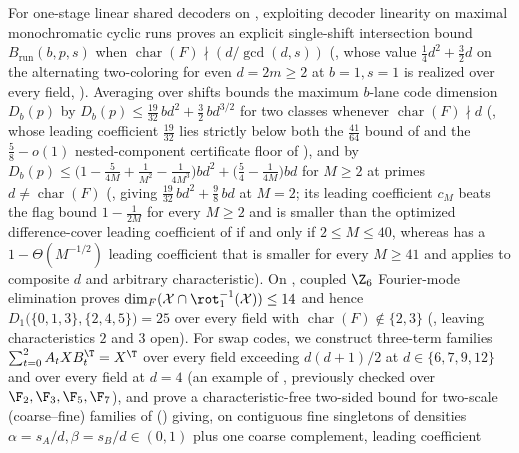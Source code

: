 For one-stage linear shared decoders on \cite[Problem~9.1(a)]{SeventeenthPaper2026}, exploiting
decoder linearity on maximal monochromatic
cyclic runs proves an explicit single-shift intersection bound $B_{\mathrm{run}}(b,p,s)$ when
$\operatorname{char}(F) \nmid (d/\gcd(d,s))$ (, whose value
$\frac{1}{4}d^2 + \frac{3}{2}d$ on the alternating two-coloring for even $d = 2m \ge 2$ at
$b = 1, s = 1$ is realized over every field, ). Averaging over shifts bounds
the maximum $b$-lane code dimension $D_b(p)$ by
$D_b(p) \le \frac{19}{32}\,bd^2 + \frac{3}{2}\,bd^{3/2}$ for two classes whenever
$\operatorname{char}(F) \nmid d$ (, whose leading coefficient $\frac{19}{32}$
lies strictly below both the $\frac{41}{64}$ bound of \cite[Theorem~3.4]{SharedDecoders2026} and the
$\frac{5}{8} - o(1)$ nested-component certificate floor of \cite[Theorem~C.6]{SharedDecoders2026}),
and by
$D_b(p) \le \bigl(1 - \frac{5}{4M} + \frac{1}{M^2} - \frac{1}{4M^3}\bigr)bd^2 +
\bigl(\frac{5}{4} - \frac{1}{4M}\bigr)bd$ for $M \ge 2$ at primes $d \ne \operatorname{char}(F)$
(, giving $\frac{19}{32}\,bd^2 + \frac{9}{8}\,bd$ at $M = 2$; its leading
coefficient $c_M$ beats the flag bound $1 - \frac{1}{2M}$ for every $M \ge 2$ and is smaller than the
optimized difference-cover leading coefficient of \cite[Theorem~3.5]{SharedDecoders2026} if and only
if $2 \le M \le 40$, whereas \cite[Theorem~3.5]{SharedDecoders2026} has a $1 - \Theta(M^{-1/2})$
leading coefficient that is smaller for every $M \ge 41$ and applies to composite $d$ and arbitrary
characteristic). On \cite[Problem~9.1(b)]{SeventeenthPaper2026}, coupled $\Z_6$ Fourier-mode
elimination proves $\dim_F(\mathcal{X} \cap \rot_1^{-1}(\mathcal{X})) \le 14$ and hence
$D_1\bigl(\{0,1,3\},\{2,4,5\}\bigr) = 25$ over every field with
$\operatorname{char}(F) \notin \{2, 3\}$ (, leaving characteristics $2$
and $3$ open). For swap codes, we construct three-term families $\sum_{t=0}^2 A_t X B_t^{\T} = X^{\T}$
over every field exceeding $d(d+1)/2$ at $d \in \{6, 7, 9, 12\}$ and over every field at $d = 4$
(an example of \cite[Remark~5.6]{SeventeenthPaper2026}, previously checked over
$\F_2, \F_3, \F_5, \F_7$), and prove a characteristic-free two-sided bound for two-scale
(coarse--fine) families of \cite[Problem~9.3]{SeventeenthPaper2026}
() giving, on contiguous fine singletons of
densities $\alpha = s_A/d, \beta = s_B/d \in (0,1)$ plus one coarse complement, leading coefficient

